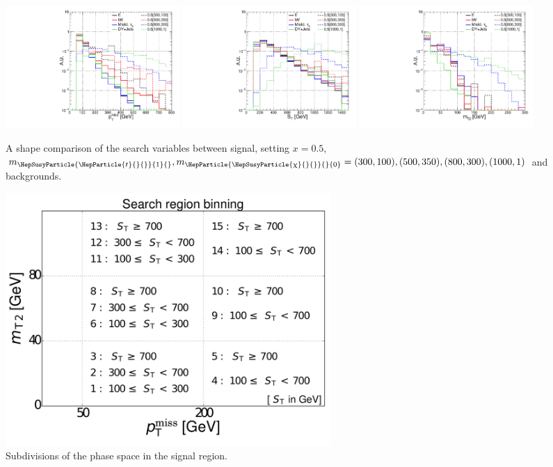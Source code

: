 \documentclass[12pt, a4paper]{article}
\DeclareRobustCommand{\PQt}{\HepParticle{t}{}{}} %
\DeclareRobustCommand{\PSQtDo}{{\HepSusyParticle{\PQt}{1}{}}\xspace}
\DeclareRobustCommand{\PSGc}{{\HepSusyParticle{\upchi}{}{}}\xspace} %
\DeclareRobustCommand{\PSGcz}{{\HepParticle{\PSGc}{}{0}}\xspace} %
\begin{document}
\begin{figure}[htb!]
	\centering
	\includegraphics[width=0.32\textwidth]{Fig/met.pdf}
	\includegraphics[width=0.32\textwidth]{Fig/ht.pdf}
		\includegraphics[width=0.32\textwidth]{Fig/mt2.pdf}
	\caption{A shape comparison of the search variables between signal, setting $x=0.5$, $m_{\PSQtDo},m_{\PSGcz}=(300,100),(500,350),(800,300),(1000,1)$ and backgrounds.}
	\label{fig:compare_shape}
\end{figure}
\begin{figure}[htb!]
	\begin{center}
		\includegraphics[width=0.6\textwidth]{Fig/sig_binning.pdf}
	\end{center}
	\caption{Subdivisions of the phase space in the signal region.}
	\label{fig:SR_Bins}
\end{figure}
\end{document}
